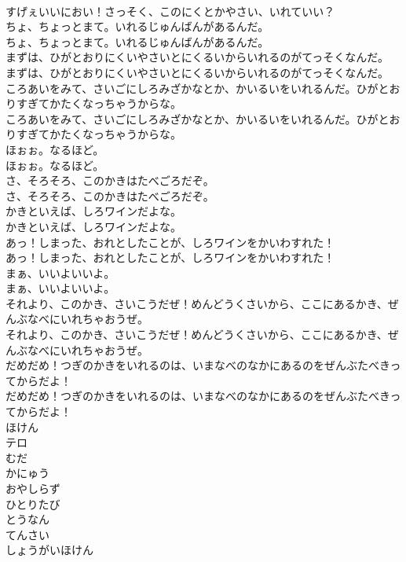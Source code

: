 \documentclass[8pt]{extreport}
\begin{document}
\begin{CJK}{UTF8}{min}
\\	すげぇいいにおい！さっそく、このにくとかやさい、いれていい？ 
\\	ちょ、ちょっとまて。いれるじゅんばんがあるんだ。	
\\	ちょ、ちょっとまて。いれるじゅんばんがあるんだ。 
\\	まずは、ひがとおりにくいやさいとにくるいからいれるのがてっそくなんだ。	
\\	まずは、ひがとおりにくいやさいとにくるいからいれるのがてっそくなんだ。 
\\	ころあいをみて、さいごにしろみざかなとか、かいるいをいれるんだ。ひがとおりすぎてかたくなっちゃうからな。	
\\	ころあいをみて、さいごにしろみざかなとか、かいるいをいれるんだ。ひがとおりすぎてかたくなっちゃうからな。 
\\	ほぉぉ。なるほど。	
\\	ほぉぉ。なるほど。 
\\	さ、そろそろ、このかきはたべごろだぞ。	
\\	さ、そろそろ、このかきはたべごろだぞ。 
\\	かきといえば、しろワインだよな。	
\\	かきといえば、しろワインだよな。 
\\	あっ！しまった、おれとしたことが、しろワインをかいわすれた！	
\\	あっ！しまった、おれとしたことが、しろワインをかいわすれた！ 
\\	まぁ、いいよいいよ。	
\\	まぁ、いいよいいよ。 
\\	それより、このかき、さいこうだぜ！めんどうくさいから、ここにあるかき、ぜんぶなべにいれちゃおうぜ。	
\\	それより、このかき、さいこうだぜ！めんどうくさいから、ここにあるかき、ぜんぶなべにいれちゃおうぜ。 
\\	だめだめ！つぎのかきをいれるのは、いまなべのなかにあるのをぜんぶたべきってからだよ！	
\\	だめだめ！つぎのかきをいれるのは、いまなべのなかにあるのをぜんぶたべきってからだよ！ 
\\	ほけん
\\	テロ
\\	むだ
\\	かにゅう
\\	おやしらず
\\	ひとりたび
\\	とうなん
\\	てんさい
\\	しょうがいほけん

\end{CJK}
\end{document}
